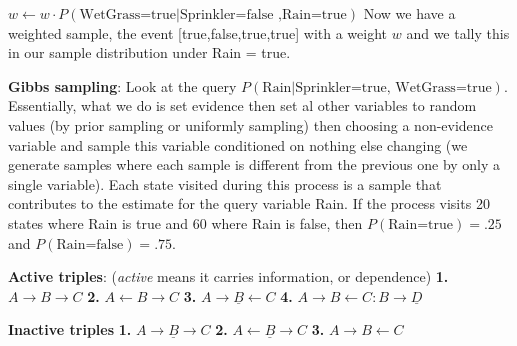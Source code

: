 \documentclass[10pt,twocolumn]{article}
\begin{document}
	 $w\leftarrow w\cdot P(\text{WetGrass=true}|\text{Sprinkler=false ,Rain=true})$
Now we have a weighted sample, the event [true,false,true,true] with a weight $w$ and we tally this in our sample distribution under Rain = true.

{\bf Gibbs sampling}:
Look at the query $P(\text{Rain}|\text{Sprinkler=true, WetGrass=true})$. Essentially, what we do is set evidence then set al other variables to random values (by prior sampling or uniformly sampling) then choosing a non-evidence variable and sample this variable conditioned on nothing else changing (we generate samples where each sample is different from the previous one by only a single variable). Each state visited during this process is a sample that contributes to the estimate for the query variable Rain. If the process visits 20 states where Rain is true and 60 where Rain is false, then $P(\text{Rain=true})=.25$ and $P(\text{Rain=false})=.75$. 

\textbf{Active triples}: (\emph{active} means it carries information, or dependence)
	\textbf{1.} $A\rightarrow B\rightarrow C$
	\textbf{2.} $A\leftarrow B\rightarrow C$
	\textbf{3.} $A\rightarrow \underline{B}\leftarrow C$
	\textbf{4.} $A\rightarrow B \leftarrow C : B \rightarrow \underline{D}$

\textbf{Inactive triples}
	\textbf{1.} $A\rightarrow \underline{B} \rightarrow C$
	\textbf{2.} $A\leftarrow \underline{B} \rightarrow C$
	\textbf{3.} $A\rightarrow B \leftarrow C$ 
\end{document}
